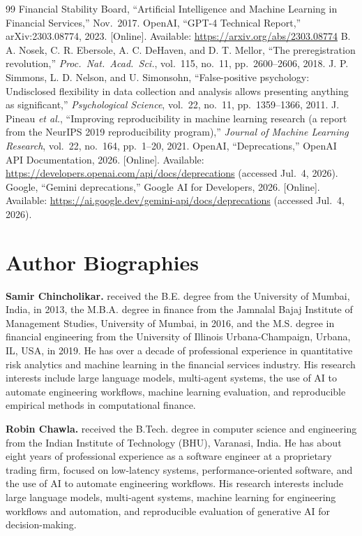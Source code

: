 \documentclass[11pt]{article}
\begin{document}
\begin{thebibliography}{99}
 Financial Stability Board, ``Artificial Intelligence and Machine Learning in Financial Services,'' Nov.\ 2017.
 OpenAI, ``GPT-4 Technical Report,'' arXiv:2303.08774, 2023. [Online]. Available: \url{https://arxiv.org/abs/2303.08774}
 B. A. Nosek, C. R. Ebersole, A. C. DeHaven, and D. T. Mellor, ``The preregistration revolution,'' \emph{Proc.\ Nat.\ Acad.\ Sci.}, vol.~115, no.~11, pp.~2600--2606, 2018.
 J. P. Simmons, L. D. Nelson, and U. Simonsohn, ``False-positive psychology: Undisclosed flexibility in data collection and analysis allows presenting anything as significant,'' \emph{Psychological Science}, vol.~22, no.~11, pp.~1359--1366, 2011.
 J. Pineau \emph{et al.}, ``Improving reproducibility in machine learning research (a report from the NeurIPS 2019 reproducibility program),'' \emph{Journal of Machine Learning Research}, vol.~22, no.~164, pp.~1--20, 2021.
 OpenAI, ``Deprecations,'' OpenAI API Documentation, 2026. [Online]. Available: \url{https://developers.openai.com/api/docs/deprecations} (accessed Jul.~4, 2026).
 Google, ``Gemini deprecations,'' Google AI for Developers, 2026. [Online]. Available: \url{https://ai.google.dev/gemini-api/docs/deprecations} (accessed Jul.~4, 2026).
\end{thebibliography}

\section*{Author Biographies}
\noindent\textbf{Samir Chincholikar.} 
received the B.E. degree from the University of Mumbai, India, in 2013, the
M.B.A. degree in finance from the Jamnalal Bajaj Institute of Management
Studies, University of Mumbai, in 2016, and the M.S. degree in financial
engineering from the University of Illinois Urbana-Champaign, Urbana, IL, USA,
in 2019. He has over a decade of professional experience in quantitative risk
analytics and machine learning in the financial services industry. His research
interests include large language models, multi-agent systems, the use of AI to
automate engineering workflows, machine learning evaluation, and reproducible
empirical methods in computational finance.




\medskip\noindent\textbf{Robin Chawla.} 
received the B.Tech. degree in computer science and engineering from the Indian
Institute of Technology (BHU), Varanasi, India. He has about eight years of
professional experience as a software engineer at a proprietary trading firm,
focused on low-latency systems, performance-oriented software, and the use of
AI to automate engineering workflows. His research interests include large
language models, multi-agent systems, machine learning for engineering
workflows and automation, and reproducible evaluation of generative AI
for decision-making.
\end{document}

